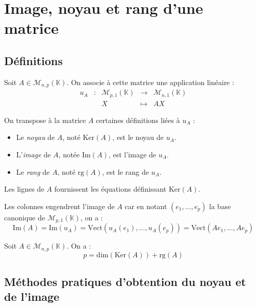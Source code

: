 \documentclass[a4paper,10pt]{report}
\begin{document}
\section{Image, noyau et rang d'une matrice}
\subsection{Définitions}
\noindent Soit $A \in \mathcal{M}_{n,p}(\mathbb{K})$. On associe à cette matrice une application linéaire :
$$ \begin{array}{ccccl}
u_A & : & \mathcal{M}_{p,1}(\mathbb{K}) & \rightarrow & \mathcal{M}_{n,1}(\mathbb{K}) \\
& & X & \mapsto & AX
\end{array}$$

\begin{defin} On transpose à la matrice $A$ certaines définitions liées à $u_A$ :
\begin{itemize}
\item Le \textit{noyau} de $A$, noté $\textrm{Ker}(A)$, est le noyau de $u_A$.
\item L'\textit{image} de $A$, notée $\textrm{Im}(A)$, est l'image de $u_A$.
\item Le \textit{rang} de $A$, noté $\textrm{rg}(A)$, est le rang de $u_A$.
\end{itemize}
\end{defin}

\begin{rems}
\item Les lignes de $A$ fournissent les équations définissant $\textrm{Ker}(A)$.
\item Les colonnes engendrent l'image de $A$ car en notant $(e_1, \ldots, e_p)$ la base canonique de $ \mathcal{M}_{p,1}(\mathbb{K}) $, on a :
$$ \textrm{Im}(A) = \textrm{Im}(u_A) = \textrm{Vect}(u_A(e_1), \ldots, u_A(e_p))= \textrm{Vect}(Ae_1, \ldots, Ae_p)$$
\end{rems}

\begin{thm} Soit $A \in \mathcal{M}_{n,p}(\mathbb{K})$. On a :
$$ p = \textrm{dim}(\textrm{Ker}(A)) + \textrm{rg}(A)$$
\end{thm}

\newpage

\subsection{Méthodes pratiques d'obtention du noyau et de l'image}
\end{document}
